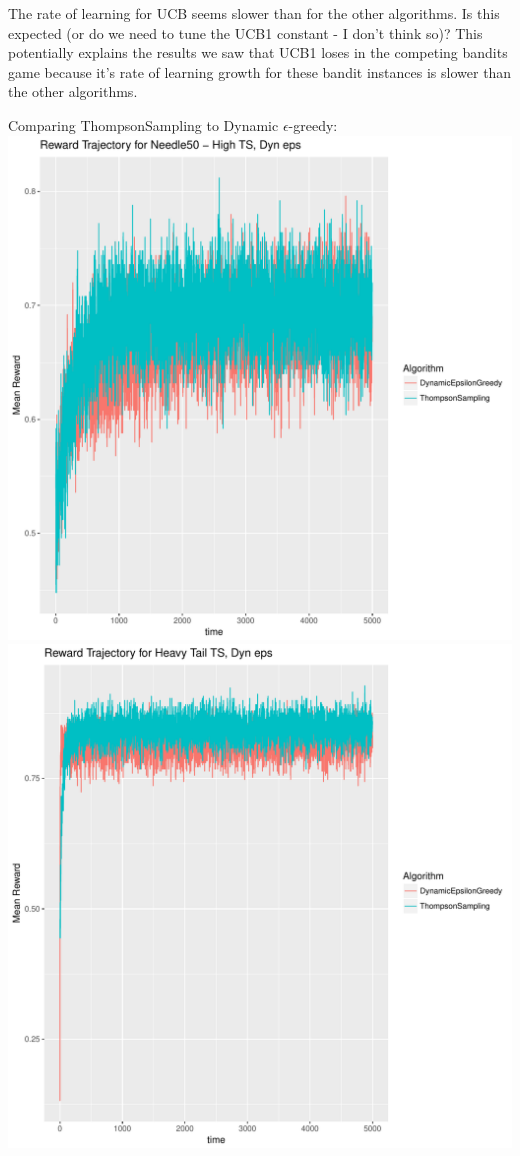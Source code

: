 \documentclass[11pt,letterpaper]{article}
\begin{document}
The rate of learning for UCB seems slower than for the other algorithms. Is this expected (or do we need to tune the UCB1 constant - I don't think so)? This potentially explains the results we saw that UCB1 loses in the competing bandits game because it's rate of learning growth for these bandit instances is slower than the other algorithms.

Comparing ThompsonSampling to Dynamic $\epsilon$-greedy: \\
\includegraphics[scale=0.5]{"../results/Reward Trajectory for Needle50 - High TS, Dyn eps"} \\
\includegraphics[scale=0.5]{"../results/Reward Trajectory for Heavy Tail TS, Dyn eps"} \\
\end{document}
